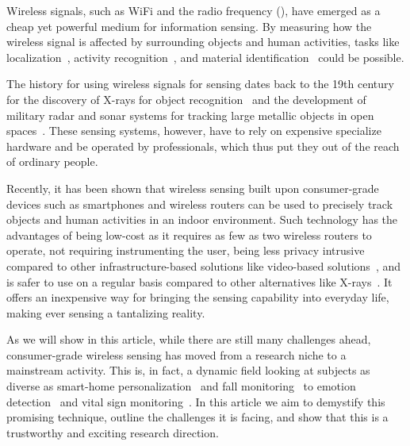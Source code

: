Wireless signals, such as WiFi and the radio frequency (\RF), have emerged as a cheap yet powerful medium for information sensing. By
measuring how the wireless signal is affected by surrounding objects and human activities, tasks like localization~\cite{Arraytrack,
Tagoram}, activity recognition~\cite{Wang2015Understanding, wang2016human}, and material identification~\cite{Tagscan, LiquID, zhao2018rf}
could be possible.


The history for using wireless signals for sensing dates back to the 19th century  for the discovery of X-rays for object
recognition~\cite{Suzuki1996} and the development of military radar and sonar systems for tracking large metallic objects in open
spaces~\cite{}. These sensing systems, however, have to rely on expensive specialize hardware and be operated by professionals, which thus
put they out of the reach of ordinary people.


Recently, it has been shown that wireless sensing built upon consumer-grade devices such as smartphones and wireless routers can be used to
precisely track objects and human activities in an indoor environment. Such technology has the advantages of being low-cost as it requires
as few as two wireless routers to operate, not requiring instrumenting the user, being less privacy intrusive compared to other
infrastructure-based solutions like video-based solutions~\cite{}, and is safer to use on a regular basis compared to other alternatives
like X-rays~\cite{}. It offers an inexpensive way for bringing the sensing capability into everyday life, making ever sensing a tantalizing
reality.


As we will show in this article, while there are still many challenges ahead, consumer-grade wireless sensing has moved from a research
niche to a mainstream activity. This is, in fact, a dynamic field looking at subjects as diverse as smart-home personalization~\cite{} and
fall monitoring~\cite{} to emotion detection~\cite{} and vital sign monitoring~\cite{}. In this article we aim to demystify this promising
technique, outline the challenges it is facing, and show that this is a trustworthy and exciting research direction.






